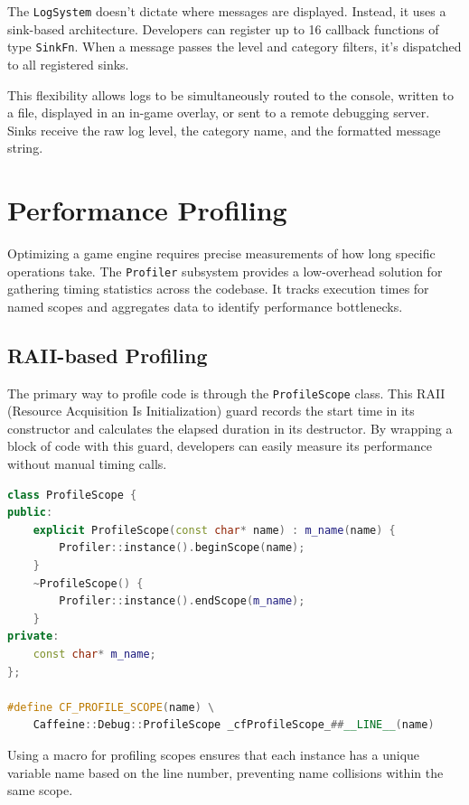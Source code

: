 The \texttt{LogSystem} doesn't dictate where messages are displayed. Instead, it uses a sink-based architecture. Developers can register up to 16 callback functions of type \texttt{SinkFn}. When a message passes the level and category filters, it's dispatched to all registered sinks.

This flexibility allows logs to be simultaneously routed to the console, written to a file, displayed in an in-game overlay, or sent to a remote debugging server. Sinks receive the raw log level, the category name, and the formatted message string.

\section{Performance Profiling}

Optimizing a game engine requires precise measurements of how long specific operations take. The \texttt{Profiler} subsystem provides a low-overhead solution for gathering timing statistics across the codebase. It tracks execution times for named scopes and aggregates data to identify performance bottlenecks.

\subsection{RAII-based Profiling}

The primary way to profile code is through the \texttt{ProfileScope} class. This RAII (Resource Acquisition Is Initialization) guard records the start time in its constructor and calculates the elapsed duration in its destructor. By wrapping a block of code with this guard, developers can easily measure its performance without manual timing calls.

\begin{lstlisting}[language=C++, caption=Profiling Macros and RAII Guard]
class ProfileScope {
public:
    explicit ProfileScope(const char* name) : m_name(name) {
        Profiler::instance().beginScope(name);
    }
    ~ProfileScope() {
        Profiler::instance().endScope(m_name);
    }
private:
    const char* m_name;
};

#define CF_PROFILE_SCOPE(name) \
    Caffeine::Debug::ProfileScope _cfProfileScope_##__LINE__(name)
\end{lstlisting}

Using a macro for profiling scopes ensures that each instance has a unique variable name based on the line number, preventing name collisions within the same scope.

